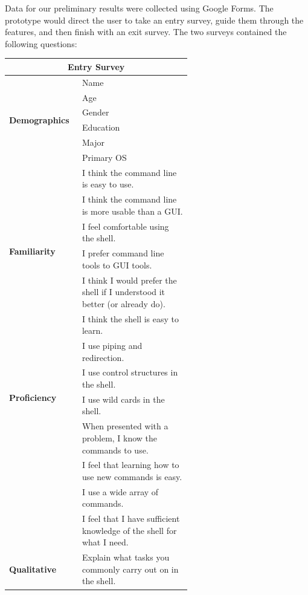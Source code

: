 Data for our preliminary results were collected using Google Forms. The
prototype would direct the user to take an entry survey, guide them through the
features, and then finish with an exit survey. The two surveys contained the
following questions:

\begin{center}
  \begin{tabular}{|l|p{0.6\linewidth}|}
    \hline
    \multicolumn{2}{|c|}{\Large \textbf{Entry Survey}}\\
    \hline
    \multirow{6}{*}{\textbf{Demographics}}
 & Name \\ \cline{2-2}
 & Age \\\cline{2-2}
 & Gender \\\cline{2-2}
 & Education \\\cline{2-2}
 & Major \\\cline{2-2}
 & Primary OS \\
    \hline
    \multirow{6}{*}{\textbf{Familiarity}}
 & I think the command line is easy to use. \\ \cline{2-2}
 & I think the command line is more usable than a GUI. \\ \cline{2-2}
 & I feel comfortable using the shell. \\ \cline{2-2}
 & I prefer command line tools to GUI tools.\\ \cline{2-2}
 & I think I would prefer the shell if I understood it better (or already
   do).\\ \cline{2-2}
 & I think the shell is easy to learn.\\
    \hline
    \multirow{4}{*}{\textbf{Proficiency}}
 & I use piping and redirection. \\ \cline{2-2}
 & I use control structures in the shell.\\ \cline{2-2}
 & I use wild cards in the shell.\\
    \hline
    \multirow{5}{*}{\textbf{Confidence}}
 & When presented with a problem, I know the commands to use. \\ \cline{2-2}
 & I feel that learning how to use new commands is easy. \\ \cline{2-2}
 & I use a wide array of commands. \\ \cline{2-2}
 & I feel that I have sufficient knowledge of the shell for what I need. \\
    \hline
    \multirow{1}{*}{\textbf{Qualitative}} & Explain what tasks you commonly carry
                                            out on in the shell.\\
    \hline
  \end{tabular}
\end{center}

